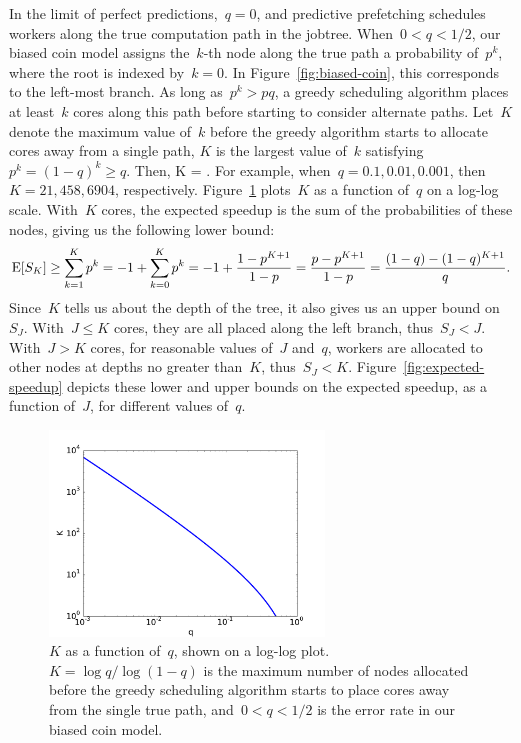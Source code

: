 \documentclass[angelino.tex]{subfiles}
\begin{document}
In the limit of perfect predictions,~${q = 0}$, and predictive prefetching
schedules workers along the true computation path in the jobtree.
When~${0 < q < 1/2}$, our biased coin model assigns the~$k$-th node along the
true path a probability of~$p^k$, where the root is indexed by~${k = 0}$. 
In Figure~\ref{fig:biased-coin}, this corresponds to the left-most branch.
As long as~${p^k > pq}$, a greedy scheduling algorithm places at least~$k$
cores along this path before starting to consider alternate paths.
Let~$K$ denote the maximum value of~$k$ before the greedy algorithm starts 
to allocate cores away from a single path, \ie $K$ is the largest value of~$k$
satisfying~${p^k = (1-q)^k \ge q}$.  Then,
\be
K = \biggl\lfloor {}\biggr\rfloor.
\label{eq:K}
\ee
For example, when~${q=0.1, 0.01, 0.001}$, then~${K=21, 458, 6904}$, respectively.
Figure~\ref{fig:speedup-K-q} plots~$K$ as a function of~$q$ on a log-log scale.
With~$K$ cores, the expected speedup is the sum of the 
probabilities of these nodes, giving us the following lower bound:
\[
\mbox{E}[S_K] \ge \sum_{k=1}^K p^k = -1 + \sum_{k=0}^K p^k = -1 + \frac{1-p^{K+1}}{1-p}
= \frac{p-p^{K+1}}{1-p}
= \frac{(1-q) - (1-q)^{K+1}}{q}.
\]
Since~$K$ tells us about the depth of the tree, it also gives us an
upper bound on~$S_J$.
With~${J \le K}$ cores, they are all placed along the left branch, thus~${S_J < J}$.
With~${J > K}$ cores, for reasonable values of~$J$ and~$q$, workers are
allocated to other nodes at depths no greater than~$K$, thus~${S_J < K}$.
Figure~\ref{fig:expected-speedup} depicts these lower and upper bounds
on the expected speedup, as a function of~$J$, for different values of~$q$.

\begin{figure}[t!]
\centering
\includegraphics[width=0.65\textwidth]{figs/speedup-K-q.pdf}
\caption{$K$ as a function of~$q$, shown on a log-log plot.
${K = \log q  / \log(1-q)}$ is the maximum number of nodes allocated before the
greedy scheduling algorithm starts to place cores away from the single true path,
and~${0 < q < 1/2}$ is the error rate in our biased coin model.
}
\label{fig:speedup-K-q}
\end{figure}
\end{document}
